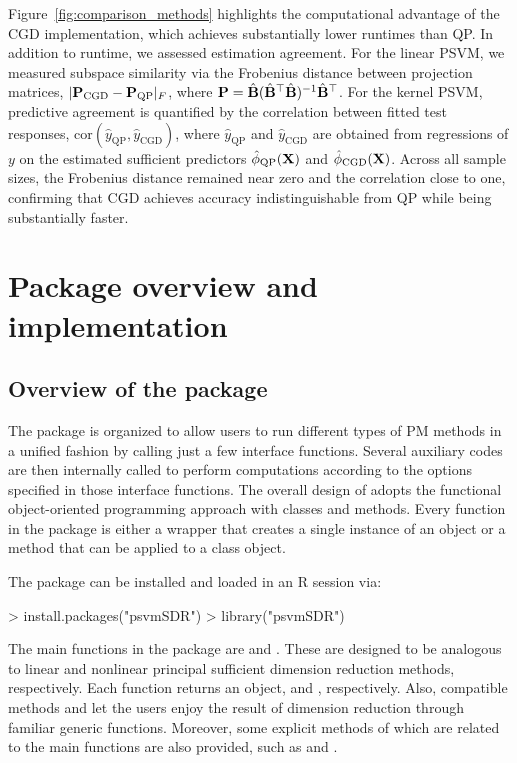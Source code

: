 {Figure~\ref{fig:comparison_methods} highlights the computational advantage of the CGD implementation, which achieves substantially lower runtimes than QP. In addition to runtime, we assessed estimation agreement. For the linear PSVM, we measured subspace similarity via the Frobenius distance between projection matrices, $|{\mathbf{P}}_{\mathrm{CGD}} - {\mathbf{P}}_{\mathrm{QP}}|_F$, where ${\mathbf{P}} = \hat{\mathbf{B}}(\hat{\mathbf{B}}^{\top}\hat{\mathbf{B}})^{-1}\hat{\mathbf{B}}^{\top}$. For the kernel PSVM, predictive agreement is quantified by the correlation between fitted test responses, $ \mathrm{cor}(\hat{y}_{\mathrm{QP}}, \hat{y}_{\mathrm{CGD}})$, where $\hat{y}_{\mathrm{QP}}$ and $\hat{y}_{\mathrm{CGD}}$ are obtained from regressions of $y$ on the estimated sufficient predictors $\hat{\phi}_{\mathrm{QP}}(\mathbf{X})$ and $\hat{\phi}_{\mathrm{CGD}}(\mathbf{X})$. Across all sample sizes, the Frobenius distance remained near zero and the correlation close to one, confirming that CGD achieves accuracy indistinguishable from QP while being substantially faster.}

\section{Package overview and implementation}\label{sec:overview}
\subsection{Overview of the package }
The  package is organized to allow users to run different types of PM methods in a unified fashion by calling just a few interface functions. Several auxiliary codes are then internally called to perform computations according to the options specified in those interface functions.
The overall design of  adopts the functional object-oriented programming approach \citep{chambers2014::R} with  classes and methods. Every function in the package is either a wrapper that creates a single instance of an object or a method that can be applied to a class object.

The package can be installed and loaded in an R session via:
\begin{example}
 > install.packages("psvmSDR")
 > library("psvmSDR")
\end{example}
The main functions in the package are  and . 
These are designed to be analogous to linear and nonlinear principal sufficient dimension reduction methods, respectively. 
Each function returns an  object,  and , respectively. 
Also, compatible  methods  and  let the users enjoy the result of dimension reduction through familiar generic functions. 
Moreover, some explicit methods of which are related to the main functions are also provided, such as  and .

